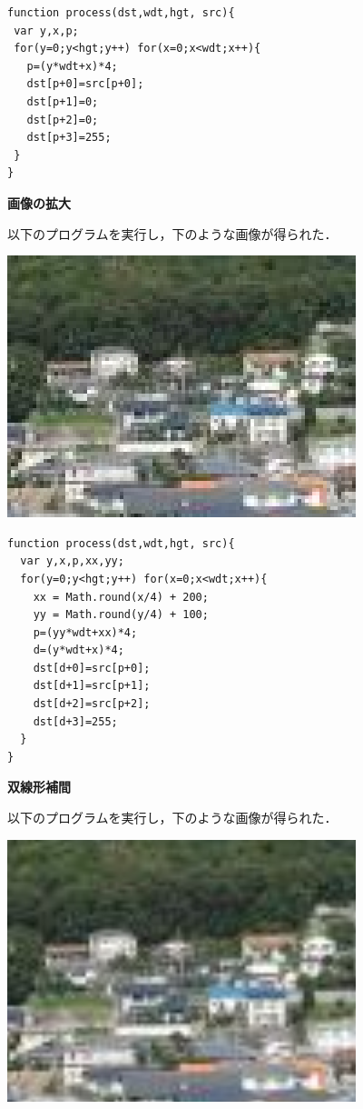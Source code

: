 \documentclass[11pt]{jarticle}
\begin{document}
\begin{lstlisting}
function process(dst,wdt,hgt, src){
 var y,x,p;
 for(y=0;y<hgt;y++) for(x=0;x<wdt;x++){
   p=(y*wdt+x)*4;
   dst[p+0]=src[p+0];
   dst[p+1]=0;
   dst[p+2]=0;
   dst[p+3]=255;
 }
}
\end{lstlisting}


{\bf 画像の拡大}

以下のプログラムを実行し，下のような画像が得られた．

\includegraphics[scale=.5]{./img/js_kakudai.png}

\begin{lstlisting}
function process(dst,wdt,hgt, src){
  var y,x,p,xx,yy;
  for(y=0;y<hgt;y++) for(x=0;x<wdt;x++){
    xx = Math.round(x/4) + 200;
    yy = Math.round(y/4) + 100;
    p=(yy*wdt+xx)*4;
    d=(y*wdt+x)*4;
    dst[d+0]=src[p+0];
    dst[d+1]=src[p+1];
    dst[d+2]=src[p+2];
    dst[d+3]=255;
  }
}
\end{lstlisting}


{\bf 双線形補間}

以下のプログラムを実行し，下のような画像が得られた．

\includegraphics[scale=.5]{./img/js_sousennkei.png}
\end{document}
